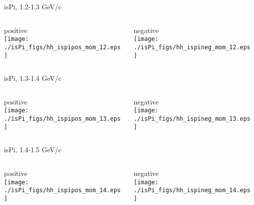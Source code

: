 \documentclass[compress]{beamer} %
\begin{document}

\begin{frame}{isPi, 1.2-1.3 GeV/c}
\begin{columns}
\begin{column}{.5\linewidth}
positive \\
\texttt{[image: ./isPi\_figs/hh\_ispipos\_mom\_12.eps]} \\
\end{column}
\begin{column}{.5\linewidth}
negative \\
\texttt{[image: ./isPi\_figs/hh\_ispineg\_mom\_12.eps]} \\
\end{column}
\end{columns}
\end{frame}


\begin{frame}{isPi, 1.3-1.4 GeV/c}
\begin{columns}
\begin{column}{.5\linewidth}
positive \\
\texttt{[image: ./isPi\_figs/hh\_ispipos\_mom\_13.eps]} \\
\end{column}
\begin{column}{.5\linewidth}
negative \\
\texttt{[image: ./isPi\_figs/hh\_ispineg\_mom\_13.eps]} \\
\end{column}
\end{columns}
\end{frame}


\begin{frame}{isPi, 1.4-1.5 GeV/c}
\begin{columns}
\begin{column}{.5\linewidth}
positive \\
\texttt{[image: ./isPi\_figs/hh\_ispipos\_mom\_14.eps]} \\
\end{column}
\begin{column}{.5\linewidth}
negative \\
\texttt{[image: ./isPi\_figs/hh\_ispineg\_mom\_14.eps]} \\
\end{column}
\end{columns}
\end{frame}
\end{document}
